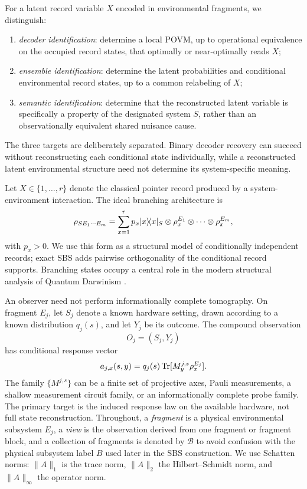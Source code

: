 \begin{definition}
For a latent record variable $X$ encoded in environmental fragments, we distinguish:
\begin{enumerate}[leftmargin=1.45em,itemsep=1pt,topsep=2pt]
\item \emph{decoder identification}: determine a local POVM, up to operational equivalence on the occupied record states, that optimally or near-optimally reads $X$;
\item \emph{ensemble identification}: determine the latent probabilities and conditional environmental record states, up to a common relabeling of $X$;
\item \emph{semantic identification}: determine that the reconstructed latent variable is specifically a property of the designated system $S$, rather than an observationally equivalent shared nuisance cause.
\end{enumerate}
\end{definition}

The three targets are deliberately separated.  Binary decoder recovery can succeed without reconstructing each conditional state individually, while a reconstructed latent environmental structure need not determine its system-specific meaning.

Let $X\in\{1,\ldots,r\}$ denote the classical pointer record produced by a system-environment interaction.  The ideal branching architecture is
\begin{equation}
\rho_{SE_1\cdots E_m}
=\sum_{x=1}^{r}p_x|x\rangle\!\langle x|_S\otimes
\rho_{x}^{E_1}\otimes\cdots\otimes\rho_x^{E_m},
\label{eq:branching}
\end{equation}
with $p_x>0$.  We use this form as a structural model of conditionally independent records; exact SBS adds pairwise orthogonality of the conditional record supports.  Branching states occupy a central role in the modern structural analysis of Quantum Darwinism \cite{touil2024branch}.

An observer need not perform informationally complete tomography.  On fragment $E_j$, let $S_j$ denote a known hardware setting, drawn according to a known distribution $q_j(s)$, and let $Y_j$ be its outcome.  The compound observation
\begin{equation}
O_j=(S_j,Y_j)
\end{equation}
has conditional response vector
\begin{equation}
a_{j,x}(s,y)=q_j(s)\operatorname{Tr}[M^{j,s}_y\rho_x^{E_j}].
\label{eq:compound-response}
\end{equation}
The family $\{M^{j,s}\}$ can be a finite set of projective axes, Pauli measurements, a shallow measurement circuit family, or an informationally complete probe family.  The primary target is the induced response law on the available hardware, not full state reconstruction.  Throughout, a \emph{fragment} is a physical environmental subsystem $E_j$, a \emph{view} is the observation derived from one fragment or fragment block, and a collection of fragments is denoted by $\mathcal B$ to avoid confusion with the physical subsystem label $B$ used later in the SBS construction.  We use Schatten norms: $\|A\|_1$ is the trace norm, $\|A\|_2$ the Hilbert--Schmidt norm, and $\|A\|_\infty$ the operator norm.

